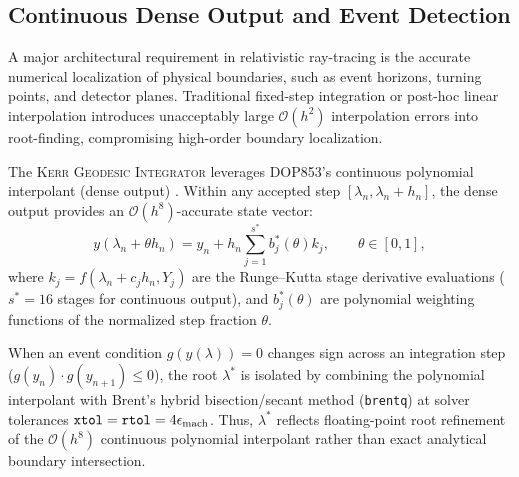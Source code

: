 \subsection{Continuous Dense Output and Event Detection}
A major architectural requirement in relativistic ray-tracing is the accurate numerical localization of physical boundaries, such as event horizons, turning points, and detector planes. Traditional fixed-step integration or post-hoc linear interpolation introduces unacceptably large $\mathcal{O}(h^2)$ interpolation errors into root-finding, compromising high-order boundary localization.

The \textsc{Kerr Geodesic Integrator} leverages \textsc{DOP853}'s continuous polynomial interpolant (dense output) \cite{Hairer1993}. Within any accepted step $[\lambda_n, \lambda_n + h_n]$, the dense output provides an $\mathcal{O}(h^8)$-accurate state vector:
\begin{equation}
    y(\lambda_n + \theta h_n) = y_n + h_n \sum_{j=1}^{s^*} b_j^*(\theta) k_j, \qquad \theta \in [0, 1],
    \label{eq:dense_output_polynomial}
\end{equation}
where $k_j = f(\lambda_n + c_j h_n, Y_j)$ are the Runge--Kutta stage derivative evaluations ($s^* = 16$ stages for continuous output), and $b_j^*(\theta)$ are polynomial weighting functions of the normalized step fraction $\theta$.

When an event condition $g(y(\lambda)) = 0$ changes sign across an integration step ($g(y_n) \cdot g(y_{n+1}) \le 0$), the root $\lambda^*$ is isolated by combining the polynomial interpolant with Brent's hybrid bisection/secant method (\texttt{brentq}) \cite{Brent1973,Virtanen2020} at solver tolerances $\texttt{xtol} = \texttt{rtol} = 4\epsilon_{\rm mach}$. Thus, $\lambda^*$ reflects floating-point root refinement of the $\mathcal{O}(h^8)$ continuous polynomial interpolant rather than exact analytical boundary intersection.

